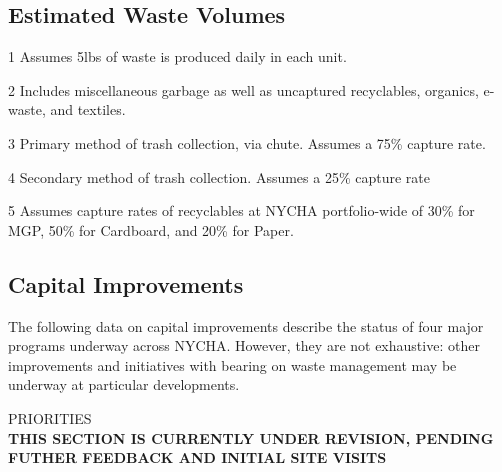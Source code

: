 \textcolor{ccorange}{\section{Estimated Waste Volumes}}


\begin{table}[H]
\begin{threeparttable}
\small



\begin{tablenotes}
\item [1] Assumes 5lbs of waste is produced daily in each unit.
\item [2] Includes miscellaneous garbage as well as uncaptured recyclables, organics, e-waste, and textiles.
\item [3] Primary method of trash collection, via chute. Assumes a 75\% capture rate.
\item [4] Secondary method of trash collection. Assumes a 25\% capture rate
\item [5] Assumes capture rates of recyclables at NYCHA portfolio-wide of 30\% for MGP, 50\% for Cardboard, and 20\% for Paper. 
\end{tablenotes}
\end{threeparttable}
\end{table}

\pagebreak

\textcolor{ccorange}{\section{Capital Improvements}}

The following data on capital improvements describe the status of four major programs underway across NYCHA. However, they are not exhaustive: other improvements and initiatives with bearing on waste management may be underway at particular developments.
\begin{table}[H]



\end{table}
\pagebreak

\textcolor{ccorange}{PRIORITIES}
\\\textbf{THIS SECTION IS CURRENTLY UNDER REVISION, PENDING FUTHER FEEDBACK AND INITIAL SITE VISITS}

\pagebreak
\pagestyle{fancy}
\fancyhf{}
\renewcommand{\chaptermark}[1]{\markboth{#1}{}}
\fancyfoot[LE,RO]{\sffamily\thepage}

